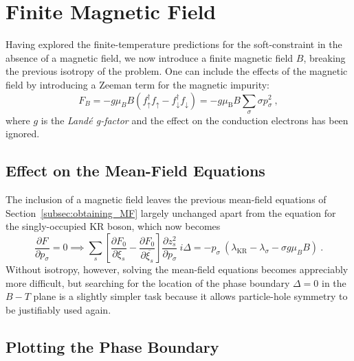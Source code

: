 
\section{Finite Magnetic Field}
\label{sec:finite_field}

Having explored the finite-temperature predictions for the soft-constraint in the absence of a magnetic field, we now introduce a finite magnetic field $ B $, breaking the previous isotropy of the problem. One can include the effects of the magnetic field by introducing a Zeeman term for the magnetic impurity: $$ F_{B} = - g \mu_{B} B \left( f^{\dagger}_{\uparrow} f^{}_{\uparrow} - f^{\dagger}_{\downarrow} f^{}_{\downarrow} \right) = - g \mu_{\text{B}} B \sum_{\sigma} \sigma p^2_{\sigma} ~ , $$ where $ g $ is the \textit{Land\'{e} g-factor} and the effect on the conduction electrons has been ignored.

\subsection{Effect on the Mean-Field Equations}

The inclusion of a magnetic field leaves the previous mean-field equations of Section~\ref{subsec:obtaining_MF} largely unchanged apart from the equation for the singly-occupied KR boson, which now becomes
\begin{equation}
\frac{\partial F}{\partial p_{\sigma}} = 0 \implies \sum_{s} \left[ \frac{\partial F_{0}}{\partial \xi_{s}} - \frac{\partial F_{0}}{\partial \overline{\xi_{s}}} \right] \frac{\partial z^2_{s}}{\partial p_{\sigma}} ~ i \Delta = - p_{\sigma} ~ (\lambda_{\text{KR}} - \lambda_{\sigma} - \sigma g \mu_{B} B) ~ .
\end{equation}
Without isotropy, however, solving the mean-field equations becomes appreciably more difficult, but searching for the location of the phase boundary $ \Delta = 0 $ in the $ B-T $ plane is a slightly simpler task because it allows particle-hole symmetry to be justifiably used again.

\subsection{Plotting the Phase Boundary}

